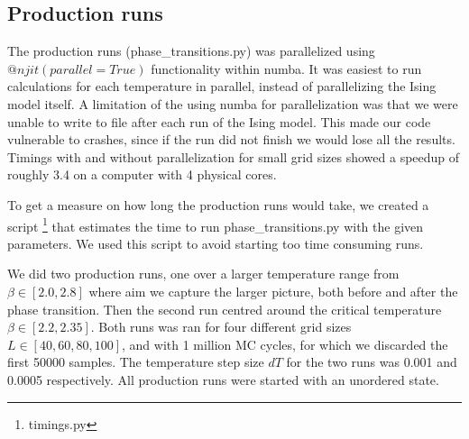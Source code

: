 \subsection{Production runs}

The production runs (phase\_transitions.py) was parallelized using
$@njit(parallel=True)$ functionality within numba. It was easiest to run
calculations for each temperature in parallel, instead of parallelizing the
Ising model itself. A limitation of the using numba for parallelization was that
we were unable to write to file after each run of the Ising model. This made
our code vulnerable to crashes, since if the run
did not finish we would lose all the results. Timings with and without parallelization for small grid sizes showed a speedup
of roughly 3.4 on a computer with 4 physical cores.

To get a measure on how long the production runs would take, we created a script
\footnote{timings.py} that estimates the time to
run phase\_transitions.py with the given parameters. We used this script  to
avoid starting too time consuming runs.

We did two production runs, one over a larger temperature range from $\beta \in
[2.0, 2.8]$ where aim we capture the larger picture, both before and after the
phase transition. Then the second run centred around the critical
temperature  $\beta \in [2.2, 2.35]$. Both runs was ran for four different grid
sizes $L \in [40,60,80,100]$, and with 1 million MC cycles, for which we
discarded the first 50000 samples. The temperature step size $dT$ for the two
runs was 0.001 and 0.0005 respectively. All production runs were started with
an unordered state.
